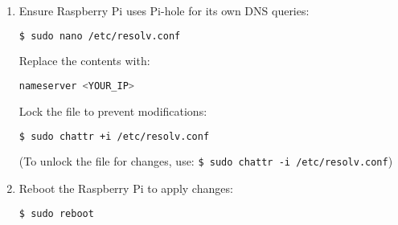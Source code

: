 \begin{enumerate}
    \item Ensure Raspberry Pi uses Pi-hole for its own DNS queries:
    \begin{lstlisting}[language=bash, breaklines=true, breakatwhitespace=true, columns=fullflexible]
    $ sudo nano /etc/resolv.conf
    \end{lstlisting}

    Replace the contents with:
    \begin{lstlisting}[language=bash, breaklines=true, breakatwhitespace=true, columns=fullflexible]
    nameserver <YOUR_IP>
    \end{lstlisting}

    Lock the file to prevent modifications:
    \begin{lstlisting}[language=bash, breaklines=true, breakatwhitespace=true, columns=fullflexible]
    $ sudo chattr +i /etc/resolv.conf
    \end{lstlisting}
 
    (To unlock the file for changes, use: \texttt{\$ sudo chattr -i /etc/resolv.conf})

    \item Reboot the Raspberry Pi to apply changes:
    \begin{lstlisting}[language=bash, breaklines=true, breakatwhitespace=true, columns=fullflexible]
    $ sudo reboot
    \end{lstlisting}

\end{enumerate}